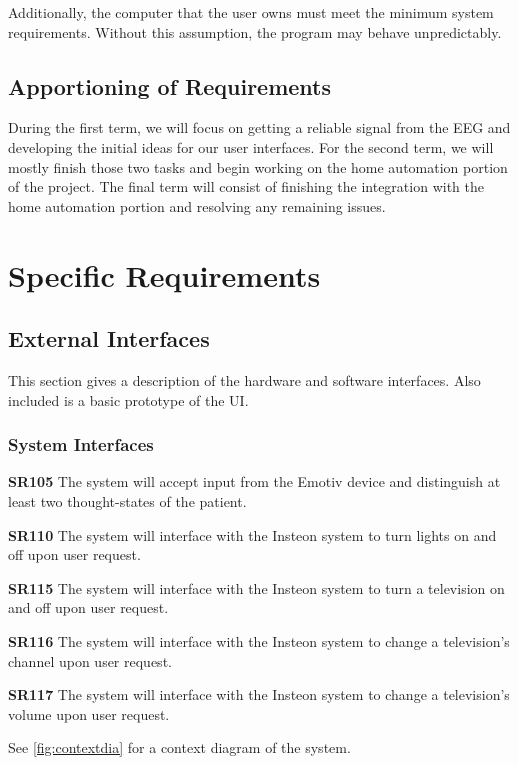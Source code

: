 \documentclass{article}
\begin{document}
Additionally, the computer that the user owns must meet the minimum system
requirements. Without this assumption, the program may behave unpredictably.

\subsection{Apportioning of Requirements}

During the first term, we will focus on getting a reliable signal from the EEG
and developing the initial ideas for our user interfaces. For the second term,
we will mostly finish those two tasks and begin working on the home automation
portion of the project. The final term will consist of finishing the
integration with the home automation portion and resolving any remaining
issues.

\newpage

\section{Specific Requirements}

\subsection{External Interfaces}

This section gives a description of the hardware and software interfaces. Also included is a basic prototype of the UI.

\subsubsection{System Interfaces}

\textbf{SR105} The system will accept input from the Emotiv device and
distinguish at least two thought-states of the patient.

\textbf{SR110} The system will interface with the Insteon system to turn
lights on and off upon user request.

\textbf{SR115} The system will interface with the Insteon system to turn a
television on and off upon user request.

\textbf{SR116} The system will interface with the Insteon system to change a
television's channel upon user request.

\textbf{SR117} The system will interface with the Insteon system to change a
television's volume upon user request.

See \autoref{fig:contextdia} for a context diagram of the system.
\end{document}

